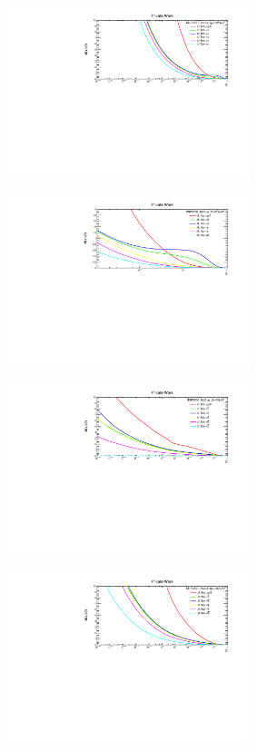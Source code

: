 \begin{figure}[H]
\begin{subfigure}{0.45\textwidth}
\vspace*{-8mm}
\caption{}
\end{subfigure}
\begin{subfigure}{0.45\textwidth}
\includegraphics[height=5cm, width=\textwidth]{chapter4/xfx1000gev_nlo.pdf}
\vspace*{-8mm}
\caption{}
\end{subfigure}
\begin{subfigure}{0.45\textwidth}
\includegraphics[height=5cm, width=\textwidth]{chapter4/xfx1000gev_nlo1.pdf}
\vspace*{-8mm}
\caption{}
\end{subfigure}
\begin{subfigure}{0.45\textwidth}
\includegraphics[height=5cm, width=\textwidth]{chapter4/barxfx10gev_nlo.pdf}
\vspace*{-8mm}
\caption{}
\end{subfigure}
\begin{subfigure}{0.45\textwidth}
\includegraphics[height=5cm, width=\textwidth]{chapter4/barxfx100gev_nlo.pdf}

\end{subfigure}
\end{figure}
